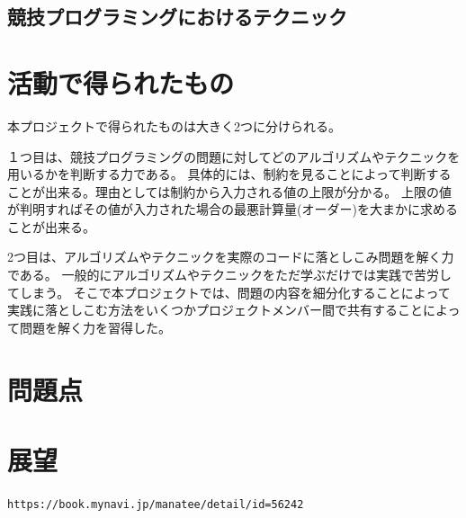 \documentclass[11pt,a4paper]{jsarticle}
\begin{document}
\subsection{競技プログラミングにおけるテクニック}
\section{活動で得られたもの}
本プロジェクトで得られたものは大きく2つに分けられる。

１つ目は、競技プログラミングの問題に対してどのアルゴリズムやテクニックを用いるかを判断する力である。
具体的には、制約を見ることによって判断することが出来る。理由としては制約から入力される値の上限が分かる。
上限の値が判明すればその値が入力された場合の最悪計算量(オーダー)を大まかに求めることが出来る。

2つ目は、アルゴリズムやテクニックを実際のコードに落としこみ問題を解く力である。
一般的にアルゴリズムやテクニックをただ学ぶだけでは実践で苦労してしまう。
そこで本プロジェクトでは、問題の内容を細分化することによって実践に落としこむ方法をいくつかプロジェクトメンバー間で共有することによって問題を解く力を習得した。

\section{問題点}
\section{展望}
\begin{thebibliography}
    \texttt{https://book.mynavi.jp/manatee/detail/id=56242}
\end{thebibliography}




%
%
\end{document}
